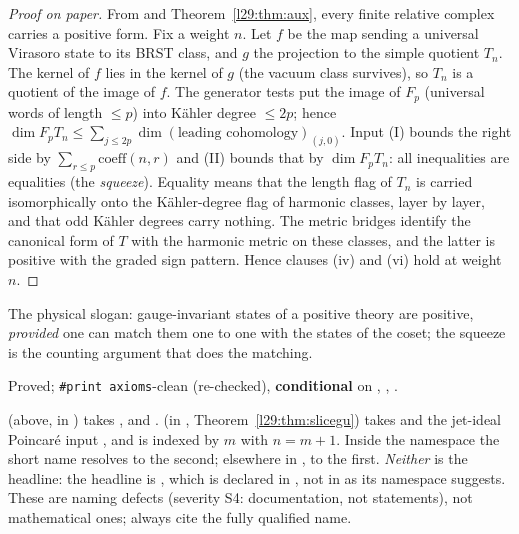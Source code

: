 \begin{proof}[Proof on paper]
From  and Theorem~\ref{l29:thm:aux}, every finite relative complex carries a positive form. Fix a
weight $n$. Let $f$ be the map sending a universal Virasoro state to its BRST class, and $g$ the projection to the simple
quotient $T_n$. The kernel of $f$ lies in the kernel of $g$ (the vacuum class survives), so $T_n$ is a quotient of the
image of $f$. The generator tests put the image of $F_p$ (universal words of length $\le p$) into Kähler degree
$\le 2p$; hence $\dim F_pT_n\le\sum_{j\le 2p}\dim(\text{leading cohomology})_{(j,0)}$. Input (I) bounds the right side by
$\sum_{r\le p}\mathrm{coeff}(n,r)$ and (II) bounds that by $\dim F_pT_n$: all inequalities are equalities (the
\emph{squeeze}). Equality means that the length flag of $T_n$ is carried isomorphically onto the Kähler-degree flag of
harmonic classes, layer by layer, and that odd Kähler degrees carry nothing. The metric bridges identify the canonical
form of $T$ with the harmonic metric on these classes, and the latter is positive with the graded sign pattern. Hence
clauses (iv) and (vi) hold at weight $n$.
\end{proof}

\begin{physics}
The physical slogan: gauge-invariant states of a positive theory are positive, \emph{provided} one can match them one to
one with the states of the coset; the squeeze is the counting argument that does the matching.
\end{physics}

\begin{status}
Proved; \texttt{\#print axioms}-clean (re-checked), \textbf{conditional} on , , .
\end{status}

\begin{warning}[title={The short name \texttt{twoSeries\_gradedUnitary\_of\_affine} denotes two different theorems}]\label{l29:warn:clash}
 (above, in ) takes ,
 and .  (in
, Theorem~\ref{l29:thm:slicegu}) takes  and the jet-ideal
Poincar\'e input , and is indexed by $m$ with $n=m+1$. Inside the namespace
 the short name resolves to the second; elsewhere in , to the first.
\emph{Neither} is the headline: the headline is ,
which is declared in , not in  as its namespace
suggests. These are naming defects (severity S4: documentation, not statements), not mathematical ones; always
cite the fully qualified name.
\end{warning}

